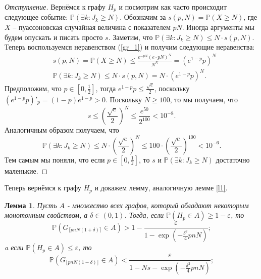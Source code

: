\documentclass[10pt]{article}
\newcommand{\PRob}{\mathbb P}
\newcommand{\leqs}{\leqslant}
\newcommand{\geqs}{\geqslant}
\newcommand{\eps}{\varepsilon}
\newtheorem{lemma}{Лемма}
\theoremstyle{named}
\begin{document}
\begin{proof}[Отступление]
Вернёмся к графу $H_p$ и посмотрим как часто происходит следующее событие: $\PRob(\exists k : J_k \geqs N)$.
Обозначим за $s(p, N) = \PRob(X \geqs N)$, где $X$ -- пуассоновская случайная величина с показателем $pN$.
Иногда аргументы мы будем опускать и писать просто $s$.
Заметим, что $\PRob(\exists k : J_k \geqs N) \leqs N \cdot s(p, N)$. 
Теперь воспользуемся неравенством (\ref{gr_1}) и получим следующие неравенства:
\begin{align}\label{ot_1}
&s(p,N) = \PRob(X \geqs N) \leqs \frac{e^{-pN}(e\cdot pN)^N}{N^N} = (e^{1-p} p )^N 
\\ \label{s_1}
&\PRob(\exists k : J_k \geqs N) \leqs N \cdot s(p, N) = N \cdot (e^{1-p} p )^N.
\end{align} 
Предположим, что $p \in [0, \frac{1}{2}]$, тогда $e^{1-p} p \leqs \frac{\sqrt{e}}{2}$, 
поскольку $(e^{1-p} p)'_p = (1-p) e^{1-p} > 0$. Поскольку $N \geqs 100$, то мы получаем, что 
\begin{equation}
s \leqs \left(\frac{\sqrt{e}}{2}\right)^N \leqs \frac{e^{50}}{2^{100}} < 10^{-8}.
\end{equation}
Аналогичным образом получаем, что 
\begin{equation}
\PRob(\exists k : J_k \geqs N) \leqs N \cdot \left(\frac{\sqrt{e}}{2}\right)^N
\leqs 100 \cdot \left(\frac{\sqrt{e}}{2}\right)^{100} < 10^{-6}.
\end{equation}
Тем самым мы поняли, что если $p \in [0, \frac{1}{2}]$, то $s$ и $\PRob(\exists k : J_k \geqs N)$ достаточно маленькие.
\end{proof}

Теперь вернёмся к графу $H_p$ и докажем лемму, аналогичную лемме \ref{l1}.

\begin{lemma} \label{l3}
Пусть $A$ - множество всех графов, который обладают некоторым монотонным свойством, а $\delta \in (0,1)$.
Тогда, если $\PRob( H_p \in A) \geqs 1 - \eps$, то
\begin{equation} \label{l3_1}
\PRob(G_{\lceil pnN(1+\delta) \rceil} \in A) > 1 - \frac{\eps}{1 - \exp\left(-\frac{\delta^2}{4}pnN\right)};
\end{equation}
a если $\PRob( H_p \in A) \leqs \eps$, то
\begin{equation}\label{l3_2}
\PRob(G_{\lfloor pnN(1-\delta) \rfloor} \in A) < \frac{\eps}{1 - Ns - \exp\left(-\frac{\delta^2}{4}pnN\right)};
\end{equation}
\end{lemma}
\end{document}
